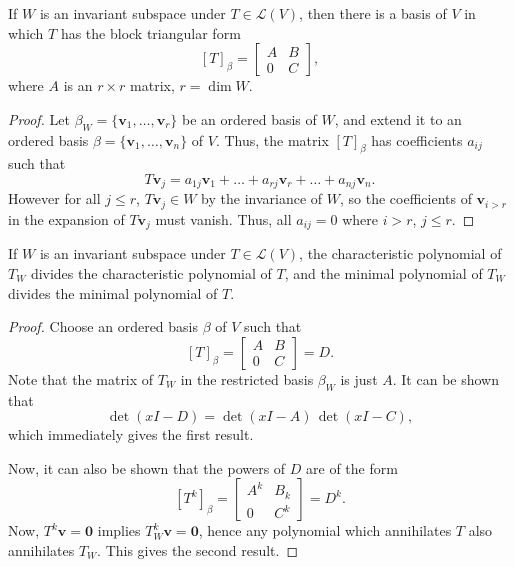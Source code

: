 \documentclass[11pt]{article}
\renewcommand{\vec}[1]{\boldsymbol{#1}}
\newcommand{\vv}{\vec{v}}
\newcommand{\alg}[1]{\mathscr{#1}}
\newcommand{\algL}{\alg{L}}
\theoremstyle{definition}
\theoremstyle{remark}
\numberwithin{equation}{section}
\begin{document}
    \begin{lemma}
        If $W$ is an invariant subspace under $T \in \algL(V)$, then there is a basis of
        $V$ in which $T$ has the block triangular form \[
            [T]_\beta = \begin{bmatrix}
                A & B \\ 0 & C
            \end{bmatrix},
        \] where $A$ is an $r \times r$ matrix, $r = \dim{W}$.
    \end{lemma}
    \begin{proof}
        Let $\beta_W = \{\vv_1, \dots, \vv_r\}$ be an ordered basis of $W$, and
        extend it to an ordered basis $\beta = \{\vv_1, \dots, \vv_n\}$ of $V$. Thus,
        the matrix $[T]_\beta$ has coefficients $a_{ij}$ such that \[
            T\vv_j = a_{1j}\vv_1 + \dots  + a_{rj}\vv_r + \dots + a_{nj}\vv_n.
        \] However for all $j \leq r$, $T\vv_j \in W$ by the invariance of $W$, so
        the coefficients of $\vv_{i > r}$ in the expansion of $T\vv_j$ must vanish.
        Thus, all $a_{ij} = 0$ where $i > r$, $j \leq r$.
    \end{proof}

    \begin{lemma}
        If $W$ is an invariant subspace under $T \in \algL(V)$, the characteristic
        polynomial of $T_W$ divides the characteristic polynomial of $T$, and the
        minimal polynomial of $T_W$ divides the minimal polynomial of $T$.
    \end{lemma}
    \begin{proof}
        Choose an ordered basis $\beta$ of $V$ such that \[
            [T]_\beta = \begin{bmatrix}
                A & B \\ 0 & C
            \end{bmatrix} = D.
        \] Note that the matrix of $T_W$ in the restricted basis $\beta_W$ is just
        $A$. It can be shown that \[
            \det(xI - D) = \det(xI - A)\,\det(xI - C),
        \] which immediately gives the first result.

        Now, it can also be shown that the powers of $D$ are of the form \[
            [T^k]_\beta = \begin{bmatrix}
                A^k & B_k \\ 0 & C^k
            \end{bmatrix} = D^k.
        \] Now, $T^k\vv = \vec{0}$ implies $T_W^k\vv = \vec{0}$, hence any
        polynomial which annihilates $T$ also annihilates $T_W$. This gives the
        second result.
    \end{proof}
\end{document}
